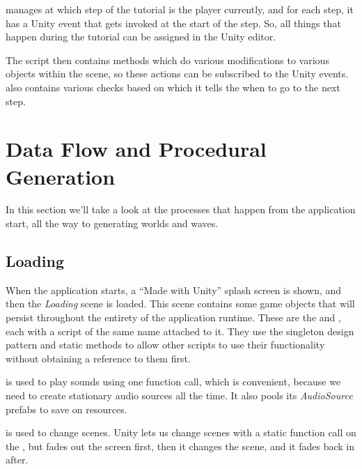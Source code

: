  manages at which step of the tutorial is the player currently, and for each step, it has a Unity event that gets invoked at the start of the step.
So, all things that happen during the tutorial can be assigned in the Unity editor.

The script  then contains methods which do various modifications to various objects within the scene, so these actions can be subscribed to the  Unity events.
 also contains various checks based on which it tells the  when to go to the next step.

\section{Data Flow and Procedural Generation}\label{sec:docs-data}



In this section we'll take a look at the processes that happen from the application start, all the way to generating worlds and waves.

\subsection{Loading}

When the application starts, a \enquote{Made with Unity} splash screen is shown, and then the \emph{Loading} scene is loaded.
This scene contains some game objects that will persist throughout the entirety of the application runtime.
These are the  and , each with a script of the same name attached to it.
They use the singleton design pattern and static methods to allow other scripts to use their functionality without obtaining a reference to them first.

 is used to play sounds using one function call, which is convenient, because we need to create stationary audio sources all the time.
It also pools its \emph{AudioSource} prefabs to save on resources.

 is used to change scenes.
Unity lets us change scenes with a static function call on the , but  fades out the screen first, then it changes the scene, and it fades back in after.

